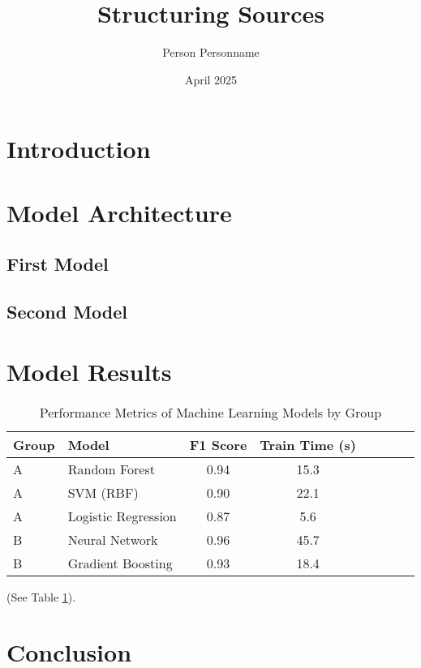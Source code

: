 \documentclass{article}
\title{Structuring Sources}
\author{Person Personname}
\date{April 2025}
\begin{document}
\maketitle

\section{Introduction}
\lipsum[1][1-5]
\autocite{dupont2021}
\lipsum[1][6-15]
\autocite{jansen2022}

\section{Model Architecture}
\lipsum[2]

\subsection{First Model}
\lipsum[3][1-5]

\subsection{Second Model}
\lipsum[3][5-10]

\section{Model Results}
\lipsum[4]

\begin{table}[h!]
\centering
\begin{tabular}{llcccccc}
\toprule
\textbf{Group} & \textbf{Model} & \textbf{F1 Score} & \textbf{Train Time (s)} \\
\midrule
A & Random Forest     & 0.94 & 15.3 \\
A & SVM (RBF)         & 0.90 & 22.1 \\
A & Logistic Regression & 0.87 & 5.6 \\
B & Neural Network     & 0.96 & 45.7 \\
B & Gradient Boosting  & 0.93 & 18.4 \\
\bottomrule
\end{tabular}
\caption{Performance Metrics of Machine Learning Models by Group}
\label{tab:model_results}
\end{table}

\lipsum[5][1]
\autocite{ivanova2020}
\lipsum[5][2]
(See Table  \ref{tab:model_results}).
\lipsum[5][6-10]

\section{Conclusion}
\lipsum[6-7]

\printbibliography
\end{document}
